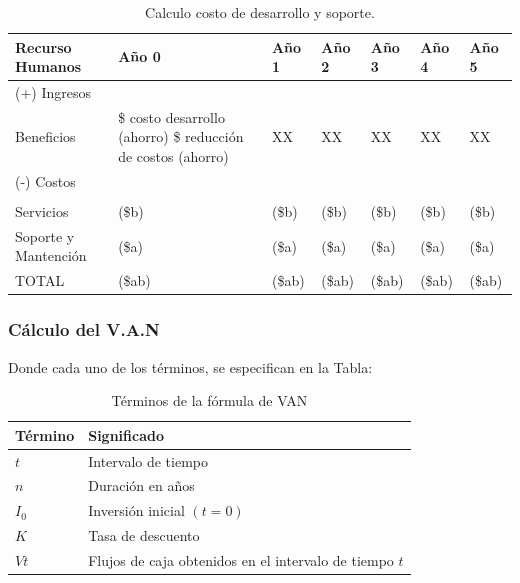 \begin{table}[H]
    \begin{center}
        \begin{tabular}{ |m{2cm}|m{2cm}|m{1cm}|m{1cm}|m{1cm}|m{1cm}|m{1cm}| }
            \hline 
            \textbf{Recurso Humanos} & \textbf{Año 0} & \textbf{Año 1} &
            \textbf{Año 2} & \textbf{Año 3} & \textbf{Año 4} & \textbf{Año 5} \\ \hline
            (+) Ingresos &  &  &  &  &  & \\ \hline
            Beneficios   & \$ costo desarrollo (ahorro) \$ reducción de costos
            (ahorro) & XX & XX & XX & XX & XX\\ \hline
            (-) Costos   &  &  &  &  &  & \\ \hline
            &  &  &  &  &  &\\ \hline
            Servicios & (\$b) & (\$b) & (\$b) & (\$b) & (\$b) & (\$b)\\ \hline
            Soporte y Mantención & (\$a) & (\$a) & (\$a) & (\$a) & (\$a) & (\$a)\\ \hline
            TOTAL & (\$ab) & (\$ab) & (\$ab) & (\$ab) & (\$ab) & (\$ab)\\ \hline
        \end{tabular}
        \caption{ Calculo costo de desarrollo y soporte.}
    \end{center}
\end{table}


\subsubsection{Cálculo del V.A.N}

Donde cada uno de los términos, se especifican en la Tabla:


 \begin{table}[H]
    \begin{center}
        \begin{tabular}{ | m{2cm} | m{8cm} | }
            \hline \textbf{Término} & \textbf{Significado }\\ \hline
            $t$ & Intervalo de tiempo   \\ \hline
            $n$ & Duración en años  \\ \hline
            $I_0$ & Inversión inicial $(t=0)$   \\ \hline
            $K$ & Tasa de descuento   \\ \hline
            $Vt$ & Flujos de caja obtenidos en el intervalo de tiempo $t$   \\ \hline
        \end{tabular}
        \caption{Términos de la fórmula de VAN}
    \end{center}
\end{table}

